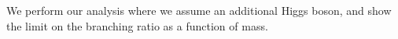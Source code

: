We perform our analysis where we assume an additional Higgs boson, and show the limit on the branching ratio as a function of mass.

